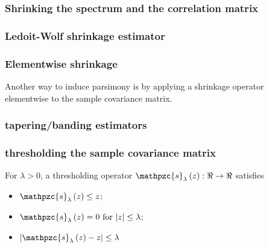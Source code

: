 \documentclass[12pt]{article}
\theoremstyle{definition}
\begin{document}
\subsubsection{Shrinking the spectrum and the correlation matrix}
\subsubsection{Ledoit-Wolf shrinkage estimator}

\subsubsection{Elementwise shrinkage} \label{subsubsection:chapter-1-sss-1-3-4}
Another way to induce parsimony is by applying a shrinkage operator elementwise to the sample covariance matrix. 

\subsubsection{tapering/banding estimators}
 

\subsubsection{thresholding the sample covariance matrix}

For $\lambda > 0$, a thresholding operator $\mathpzc{s}_\lambda\left( z \right): \Re \rightarrow \Re$ satisfies 
\begin{itemize}
\item $\mathpzc{s}_\lambda\left( z \right) \le z$;
\item $\mathpzc{s}_\lambda\left( z \right) = 0 \mbox{ for } \vert z\vert \le \lambda$;
\item $\vert \mathpzc{s}_\lambda\left( z \right) - z \vert \le \lambda$
\end{itemize}
\end{document}
